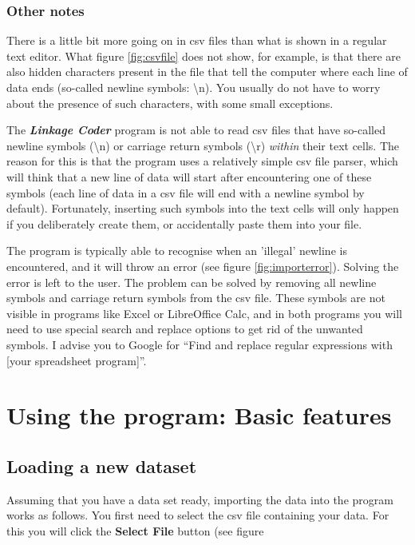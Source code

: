 \documentclass{memoir}
\begin{document}
\subsection{Other notes}
\label{sec:othernotesdatasets}

There is a little bit more going on in csv files than what is shown in a regular text editor. What figure \ref{fig:csvfile} does not show, for example, is that there are also hidden characters present in the file that tell the computer where each line of data ends (so-called newline symbols: \textbackslash n). You usually do not have to worry about the presence of such characters, with some small exceptions. 

The \emph{\textbf{Linkage Coder}} program is not able to read csv files that have so-called newline symbols (\textbackslash n) or carriage return symbols (\textbackslash r) \emph{within} their text cells. The reason for this is that the program uses a relatively simple csv file parser, which will think that a new line of data will start after encountering one of these symbols (each line of data in a csv file will end with a newline symbol by default). Fortunately, inserting such symbols into the text cells will only happen if you deliberately create them, or accidentally paste them into your file. 

The program is typically able to recognise when an 'illegal' newline is encountered, and it will throw an error (see figure \ref{fig:importerror}). Solving the error is left to the user. The problem can be solved by removing all newline symbols and carriage return symbols from the csv file. These symbols are not visible in programs like Excel or LibreOffice Calc, and in both programs you will need to use special search and replace options to get rid of the unwanted symbols. I advise you to Google for ``Find and replace regular expressions with [your spreadsheet program]''. 

\chapter{Using the program: Basic features}
\label{chap:usingtheprogram}

\section{Loading a new dataset}
\label{sec:loadingnewdataset}

Assuming that you have a data set ready, importing the data into the program works as follows. You first need to select the csv file containing your data. For this you will click the \textbf{Select File} button (see figure %
\end{document}
